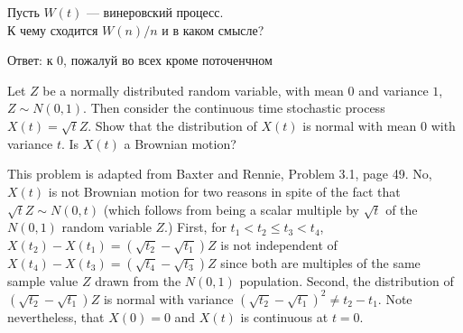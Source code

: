 \begin{problem}
Пусть $W(t)$ — винеровский процесс. \\
К чему сходится $W(n)/n$ и в каком смысле?

\begin{sol}
Ответ: к 0, пожалуй во всех кроме поточенчном
\end{sol}
\end{problem}

\begin{problem}
  Let $Z$ be a normally distributed random variable, with mean
  $0$ and variance $1$, $Z \sim N(0,1)$.  Then consider the continuous
  time stochastic process $X(t) = \sqrt{t} Z$. Show that the distribution of
  $X(t)$ is normal with mean $0$ with variance $t$.  Is $X(t)$ a
  Brownian motion?

\begin{sol}

This problem is adapted from Baxter and Rennie, Problem 3.1, page 49.
No, $X(t)$ is not Brownian motion for two reasons in spite of the fact
that $\sqrt{t} Z \sim N(0,t)$ (which follows from being a scalar
multiple by $\sqrt{t}$ of the $N(0,1)$ random variable $Z$.)
First, for $t_1 < t_2 \le t_3 < t_4$, $X(t_2) - X(t_1) = (\sqrt{t_2} -
\sqrt{t_1})Z$ is not independent of $X(t_4) - X(t_3) = (\sqrt{t_4} -
\sqrt{t_3})Z$ since both are multiples of the same sample value $Z$
drawn from the $N(0,1)$ population.
Second, the distribution of $(\sqrt{t_2} - \sqrt{t_1})Z$ is normal
with variance $(\sqrt{t_2} - \sqrt{t_1})^2 \ne t_2 - t_1$.
Note nevertheless, that $X(0) = 0$ and $X(t)$ is continuous at $t=0$.
\end{sol}
\end{problem}

